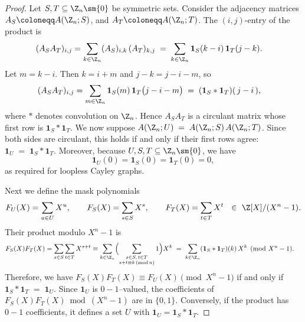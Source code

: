 \documentclass{file}
\begin{document}
\begin{proof}
Let $S,T\subseteq \Z_n\sm\{0\}$ be symmetric sets. Consider the adjacency matrices
$A_S \coloneqq A(\Z_n;S)$, and $A_T \coloneqq A(\Z_n;T)$.
The $(i,j)$-entry of the product is
\begin{align*}
(A_S A_T)_{i,j}
  &= \sum_{k\in \Z_n} (A_S)_{i,k}\,(A_T)_{k,j}
   \;=\; \sum_{k\in \Z_n} \mathbf{1}_S(k-i)\,\mathbf{1}_T(j-k).
\end{align*}
Let $m=k-i$. Then $k=i+m$ and $j-k=j-i-m$, so
\begin{align*}
(A_S A_T)_{i,j}
  &= \sum_{m\in \Z_n} \mathbf{1}_S(m)\,\mathbf{1}_T\bigl(j-i-m\bigr)
   \;=\; (\mathbf{1}_S * \mathbf{1}_T)(\,j-i\,),
\end{align*}
where $*$ denotes convolution on $\Z_n$.
Hence $A_SA_T$ is a circulant matrix whose first row is $\mathbf{1}_S * \mathbf{1}_T$.
We now suppose
$A(\Z_n;U) \;=\; A(\Z_n;S)\,A(\Z_n;T)$.
Since both sides are circulant, this holds if and only if their first rows agree:
$\mathbf{1}_U \;=\; \mathbf{1}_S * \mathbf{1}_T$.
Moreover, because $U,S,T\subseteq \Z_n\sm\{0\}$, we have
\[
\mathbf{1}_U(0)=\mathbf{1}_S(0)=\mathbf{1}_T(0)=0,
\]
as required for loopless Cayley graphs.

\medskip
Next we define the mask polynomials
\[
F_U(X)=\sum_{u\in U} X^{u},\qquad
F_S(X)=\sum_{s\in S} X^{s},\qquad
F_T(X)=\sum_{t\in T} X^{t}\ \ \in \ \Z[X]/(X^n-1).
\]
Their product modulo $X^n-1$ is
\begin{align*}
F_S(X)F_T(X)
  &= \sum_{s\in S}\sum_{t\in T} X^{s+t}
   \equiv \sum_{k\in \Z_n}
        \Bigl(\sum_{\substack{s\in S,\,t\in T\\ s+t\equiv k \,(\mathrm{mod}\, n)}} 1\Bigr) X^{k}
   \;=\; \sum_{k\in \Z_n} (\mathbf{1}_S * \mathbf{1}_T)(k)\,X^{k} \pmod{X^n-1}.
\end{align*}
Therefore, we have $F_S(X)F_T(X)\equiv F_U(X)\pmod{X^n-1}$ if and only if $
\mathbf{1}_S * \mathbf{1}_T \;=\; \mathbf{1}_U$.
Since $\mathbf{1}_U$ is $0\!-\!1$–valued, the coefficients of $F_S(X)F_T(X)\bmod (X^n-1)$ are in $\{0,1\}$.
Conversely, if the product has $0\!-\!1$ coefficients, it defines a set $U$ with $\mathbf{1}_U=\mathbf{1}_S * \mathbf{1}_T$.
\end{proof}
\end{document}
